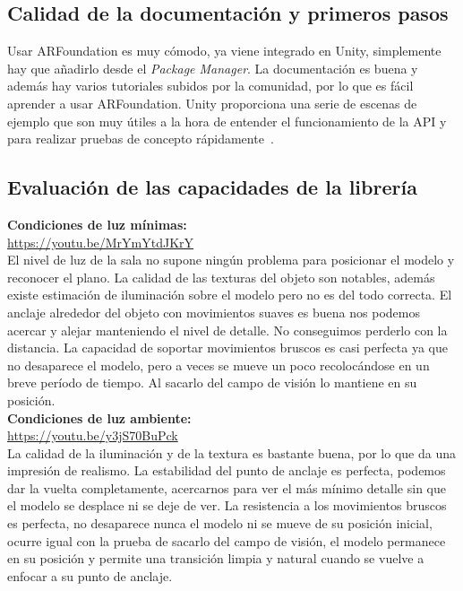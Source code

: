 \subsection{Calidad de la documentación y primeros pasos}
Usar ARFoundation es muy cómodo, ya viene integrado en Unity, simplemente hay que añadirlo desde el \textit{Package Manager}. La documentación es buena y además hay varios tutoriales subidos por la comunidad, por lo que es fácil aprender a usar ARFoundation. Unity proporciona una serie de escenas de ejemplo que son muy útiles a la hora de entender el funcionamiento de la API y para realizar pruebas de concepto rápidamente~\cite{UnityGithub}.


\subsection{Evaluación de las capacidades de la librería}
\textbf{Condiciones de luz mínimas:}\\
\url{https://youtu.be/MrYmYtdJKrY}\\

El nivel de luz de la sala no supone ningún problema para posicionar el modelo y reconocer el plano. La calidad de las texturas del objeto son notables, además existe estimación de iluminación sobre el modelo pero no es del todo correcta. El anclaje alrededor del objeto con movimientos suaves es buena nos podemos acercar y alejar manteniendo el nivel de detalle. No conseguimos perderlo con la distancia. La capacidad de soportar movimientos bruscos es casi perfecta ya que no desaparece el modelo, pero a veces se mueve un poco recolocándose en un breve período de tiempo. Al sacarlo del campo de visión lo mantiene en su posición.\\

\textbf{Condiciones de luz ambiente:}\\
\url{https://youtu.be/y3jS70BuPck}\\

La calidad de la iluminación y de la textura es bastante buena, por lo que da una impresión de realismo. La estabilidad del punto de anclaje es perfecta, podemos dar la vuelta completamente, acercarnos para ver el más mínimo detalle sin que el modelo se desplace ni se deje de ver. La resistencia a los movimientos bruscos es perfecta, no desaparece nunca el modelo ni se mueve de su posición inicial, ocurre igual con la prueba de sacarlo del campo de visión, el modelo permanece en su posición y permite una transición limpia y natural cuando se vuelve a enfocar a su punto de anclaje.

